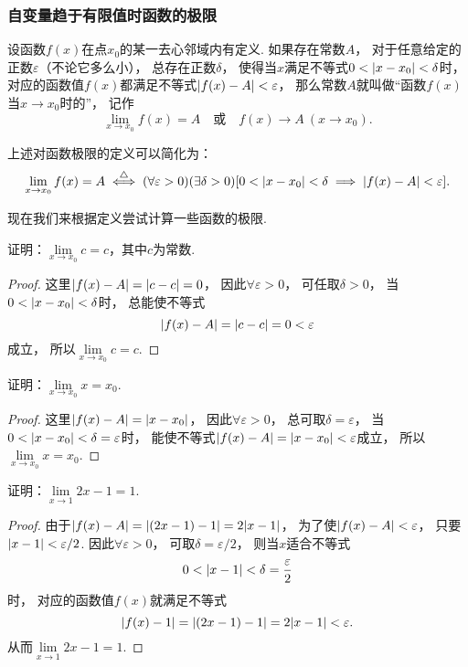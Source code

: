 \subsubsection*{自变量趋于有限值时函数的极限}
\begin{definition}\label{definition:极限.函数极限的定义1}
设函数\(f(x)\)在点\(x_0\)的某一去心邻域内有定义.
如果存在常数\(A\)，
对于任意给定的正数\(\varepsilon\)（不论它多么小），
总存在正数\(\delta\)，
使得当\(x\)满足不等式\(0 < \abs{x-x_0} < \delta\)时，
对应的函数值\(f(x)\)都满足不等式\(\abs{f(x)-A}<\varepsilon\)，
那么常数\(A\)就叫做“函数\(f(x)\)当\(x \to x_0\)时的”，
记作
\[
	\lim\limits_{x \to x_0} f(x) = A
	\quad\text{或}\quad
	f(x) \to A\ (x \to x_0).
\]
\end{definition}

上述对函数极限的定义可以简化为：
\[
	\lim\limits_{x \to x_0}f(x) = A
	\overset{\triangle}{\iff}
	(\forall \varepsilon > 0)
	(\exists \delta > 0)
	[0 < \abs{x - x_0} < \delta \implies \abs{f(x) - A} < \varepsilon].
\]

现在我们来根据定义尝试计算一些函数的极限.
\begin{example}
证明：\(\lim\limits_{x \to x_0} c = c\)，其中\(c\)为常数.
\begin{proof}
这里\(\abs{f(x) - A} = \abs{c - c} = 0\)，
因此\(\forall \varepsilon > 0\)，
可任取\(\delta > 0\)，
当\(0 < \abs{x - x_0} < \delta\)时，
总能使不等式\[
	\abs{f(x) - A} = \abs{c - c} = 0 < \varepsilon
\]成立，
所以\(\lim\limits_{x \to x_0} c = c\).
\end{proof}
\end{example}

\begin{example}
证明：\(\lim\limits_{x \to x_0} x = x_0\).
\begin{proof}
这里\(\abs{f(x) - A} = \abs{x - x_0}\)，
因此\(\forall \varepsilon > 0\)，
总可取\(\delta = \varepsilon\)，
当\(0 < \abs{x - x_0} < \delta = \varepsilon\)时，
能使不等式\(\abs{f(x) - A} = \abs{x - x_0} < \varepsilon\)成立，
所以\(\lim\limits_{x \to x_0} x = x_0\).
\end{proof}
\end{example}

\begin{example}
证明：\(\lim\limits_{x\to1} 2x-1 = 1\).
\begin{proof}
由于\(\abs{f(x) - A} = \abs{(2x-1) - 1} = 2\abs{x-1}\)，
为了使\(\abs{f(x) - A} < \varepsilon\)，
只要\(\abs{x-1}<\varepsilon/2\).
因此\(\forall \varepsilon > 0\)，
可取\(\delta = \varepsilon/2\)，
则当\(x\)适合不等式\[
	0 < \abs{x-1} < \delta = \frac{\varepsilon}{2}
\]时，
对应的函数值\(f(x)\)就满足不等式\[
	\abs{f(x) - 1} = \abs{(2x-1) - 1} = 2\abs{x-1} < \varepsilon.
\]
从而\(\lim\limits_{x\to1} 2x-1 = 1\).
\end{proof}
\end{example}

